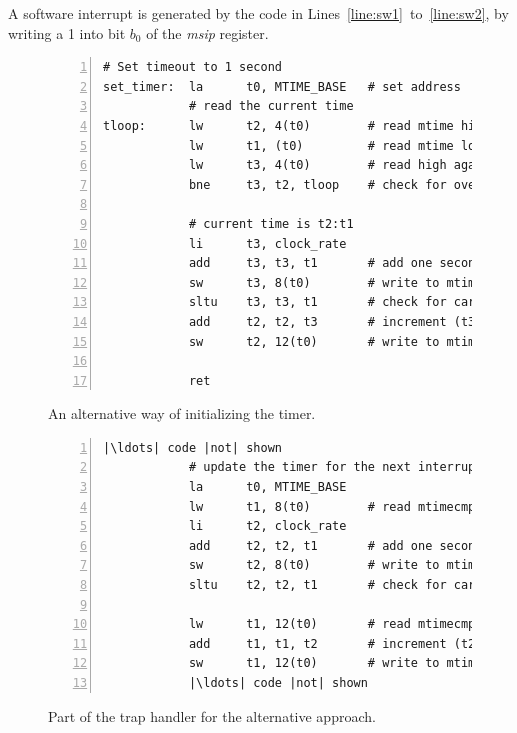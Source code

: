 \documentclass[11pt, twoside, pdftex]{article}
\begin{document}
A software interrupt is generated by the code in Lines~\ref{line:sw1}~to~\ref{line:sw2},
by writing a 1 into bit $b_0$ of the {\it msip} register.

\begin{figure}[H]
\begin{center}
\begin{minipage}[h]{16 cm}
\begin{lstlisting}[style=defaultNiosVStyle, name=vecs, numbers=left, escapechar=|]
# Set timeout to 1 second
set_timer:  la      t0, MTIME_BASE   # set address
            # read the current time
tloop:      lw      t2, 4(t0)        # read mtime high
            lw      t1, (t0)         # read mtime low
            lw      t3, 4(t0)        # read high again
            bne     t3, t2, tloop    # check for overflow from low to high
            
            # current time is t2:t1
            li      t3, clock_rate
            add     t3, t3, t1       # add one second to current time
            sw      t3, 8(t0)        # write to mtimecmp low
            sltu    t3, t3, t1       # check for carry-out
            add     t2, t2, t3       # increment (t3 = carry-out)
            sw      t2, 12(t0)       # write to mtimecmp high

            ret
\end{lstlisting}
	\caption{An alternative way of initializing the timer.}
	\label{fig:set_timer}
\end{minipage}
\end{center}
\end{figure}

\begin{figure}[H]
\begin{center}
\begin{minipage}[h]{16 cm}
\begin{lstlisting}[style=defaultNiosVStyle, name=vecs, numbers=left, escapechar=|]
            |\ldots| code |not| shown
            # update the timer for the next interrupt cycle
            la      t0, MTIME_BASE
            lw      t1, 8(t0)        # read mtimecmp low
            li      t2, clock_rate
            add     t2, t2, t1       # add one second to mtimecmp
            sw      t2, 8(t0)        # write to mtimecmp low
            sltu    t2, t2, t1       # check for carry-out from addition

            lw      t1, 12(t0)       # read mtimecmp high
            add     t1, t1, t2       # increment (t2 = carry-out)
            sw      t1, 12(t0)       # write to mtimecmp high
            |\ldots| code |not| shown
\end{lstlisting}
	\caption{Part of the trap handler for the alternative approach.}
	\label{fig:trap_mtimecmp}
\end{minipage}
\end{center}
\end{figure}
\end{document}
